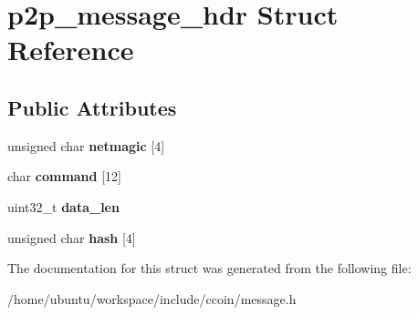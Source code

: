 \hypertarget{structp2p__message__hdr}{\section{p2p\-\_\-message\-\_\-hdr Struct Reference}
\label{structp2p__message__hdr}
}
\subsection*{Public Attributes}
\begin{DoxyCompactItemize}
\item 
\hypertarget{structp2p__message__hdr_a1317e983ad2ac08d2b9ee4bea02c3144}{unsigned char {\bfseries netmagic} \mbox{[}4\mbox{]}}\label{structp2p__message__hdr_a1317e983ad2ac08d2b9ee4bea02c3144}

\item 
\hypertarget{structp2p__message__hdr_af753c8431ed82fc57bc5c81433c7db05}{char {\bfseries command} \mbox{[}12\mbox{]}}\label{structp2p__message__hdr_af753c8431ed82fc57bc5c81433c7db05}

\item 
\hypertarget{structp2p__message__hdr_a8e718a951bb51f94a285cc5058d25be9}{uint32\-\_\-t {\bfseries data\-\_\-len}}\label{structp2p__message__hdr_a8e718a951bb51f94a285cc5058d25be9}

\item 
\hypertarget{structp2p__message__hdr_afc8675117c7e27161bb0f91a5d85fb53}{unsigned char {\bfseries hash} \mbox{[}4\mbox{]}}\label{structp2p__message__hdr_afc8675117c7e27161bb0f91a5d85fb53}

\end{DoxyCompactItemize}


The documentation for this struct was generated from the following file\-:\begin{DoxyCompactItemize}
\item 
/home/ubuntu/workspace/include/ccoin/message.\-h\end{DoxyCompactItemize}
